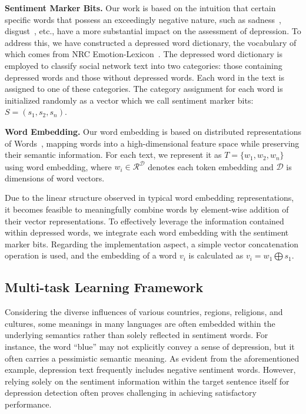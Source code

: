 \documentclass[runningheads]{llncs}
\begin{document}
\textbf{Sentiment Marker Bits.} Our work is based on the intuition that certain specific words that possess an exceedingly negative nature, such as sadness~\cite{mouchet2022sadness}, disgust~\cite{ypsilanti2019self}, etc., have a more substantial impact on the assessment of depression. To address this, we have constructed a depressed word dictionary, the vocabulary of which comes from NRC Emotion-Lexicon~\cite{mohammad2013nrc}. The depressed word dictionary is employed to classify social network text into two categories: those containing depressed words and those without depressed words. Each word in the text is assigned to one of these categories. The category assignment for each word is initialized randomly as a vector which we call sentiment marker bits: $ S = (s_1, s_2, s_n)$.

\textbf{Word Embedding.} Our word embedding is based on distributed representations of Words~\cite{mikolov2013distributed}, mapping words into a high-dimensional feature space while  preserving their semantic information. For each text, we represent it as $T = \{w_1, w_2, w_n \}$ using word embedding, where $w_i\in\mathcal{R^D}$ denotes each token embedding and $\mathcal{D}$ is dimensions of word vectors. 

Due to the linear structure observed in typical word embedding representations, it becomes feasible to meaningfully combine words by element-wise addition of their vector representations. To effectively leverage the information contained within depressed words, we integrate each word embedding with the sentiment marker bits. Regarding the implementation aspect, a simple vector concatenation operation is used, and the embedding of a word $v_i$ is calculated as $v_i = w_1 \bigoplus s_1$.

\subsection{Multi-task Learning Framework}
Considering the diverse influences of various countries, regions, religions, and cultures, some meanings in many languages are often embedded within the underlying semantics rather than solely reflected in sentiment words. For instance, the word ``blue'' may not explicitly convey a sense of depression, but it often carries a pessimistic semantic meaning. As evident from the aforementioned example, depression text frequently includes negative sentiment words. However, relying solely on the sentiment information within the target sentence itself for depression detection often proves challenging in achieving satisfactory performance. 
\end{document}
